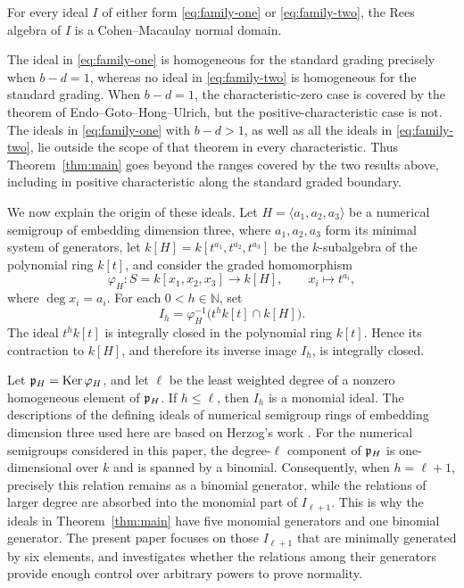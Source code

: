 \begin{theoremA}\label{thm:main}
For every ideal $I$ of either form \eqref{eq:family-one} or
\eqref{eq:family-two}, the Rees algebra of $I$ is a Cohen--Macaulay normal
domain.
\end{theoremA}

The ideal in \eqref{eq:family-one} is homogeneous for the standard grading
precisely when $b-d=1$, whereas no ideal in \eqref{eq:family-two} is
homogeneous for the standard grading.  When $b-d=1$, the
characteristic-zero case is covered by the theorem of
Endo--Goto--Hong--Ulrich, but the positive-characteristic case is not.  The
ideals in \eqref{eq:family-one} with $b-d>1$, as well as all the ideals in
\eqref{eq:family-two}, lie outside the scope of that theorem in every
characteristic.  Thus Theorem~\ref{thm:main} goes beyond the ranges covered by the two
results above, including in positive characteristic along the standard graded
boundary.

We now explain the origin of these ideals.  Let
$H=\langle a_1,a_2,a_3\rangle$ be a numerical semigroup of embedding
dimension three, where $a_1,a_2,a_3$ form its minimal system of generators,
let $k[H]=k[t^{a_1},t^{a_2},t^{a_3}]$ be the $k$-subalgebra of the polynomial ring $k[t]$, and consider the graded homomorphism
\[
 \varphi_H\colon S=k[x_1,x_2,x_3]\longrightarrow k[H],
 \qquad x_i\longmapsto t^{a_i},
\]
where $\deg x_i=a_i$.  For each $0<h\in\mathbb N$, set
\[
 I_h=\varphi_H^{-1}\bigl(t^hk[t]\cap k[H]\bigr).
\]
The ideal $t^hk[t]$ is integrally closed in the polynomial ring $k[t]$.
Hence its contraction to $k[H]$, and therefore its inverse image
$I_h$, is integrally closed.

Let $\mathfrak{p}_H=\operatorname{Ker}\varphi_H$, and let $\ell$ be the least weighted degree of a
nonzero homogeneous element of $\mathfrak{p}_H$.  If $h\leq\ell$, then $I_h$ is a
monomial ideal.  The descriptions of the defining ideals of numerical
semigroup rings of embedding dimension three used here are based on Herzog's work
\cite{Herzog1970}.  For the numerical semigroups considered in this paper,
the degree-$\ell$ component of $\mathfrak{p}_H$ is one-dimensional over $k$ and is
spanned by a binomial.  Consequently, when $h=\ell+1$, precisely this relation
remains as a binomial generator, while the relations of larger degree are
absorbed into the monomial part of $I_{\ell+1}$.  This is why the ideals in
Theorem~\ref{thm:main} have five monomial generators and one binomial generator.
The present paper focuses on those $I_{\ell+1}$ that are minimally generated
by six elements, and investigates whether the relations among their
generators provide enough control over arbitrary powers to prove normality.

